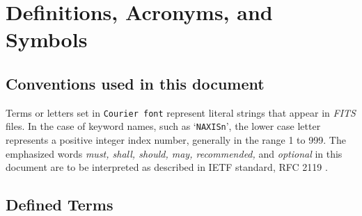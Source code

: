 \documentclass[11pt,makeidx]{book}     %
\begin{document}

\chapter{Definitions, Acronyms, and Symbols}
\label{s:def}

\section{Conventions used in this document}

Terms or letters set in {\tt Courier font} represent literal strings 
that appear in {\em FITS\/} files.  In the case of keyword names, such as
`{\tt NAXISn}', the lower case letter represents a positive integer  index number,
generally in the range 1 to 999.
The emphasized words {\em must, shall, should, may, recommended,} and {\em optional} 
in this document are to be interpreted as 
described in IETF standard, RFC 2119 \cite{rfc2119}.

\section{Defined Terms}
\end{document}
